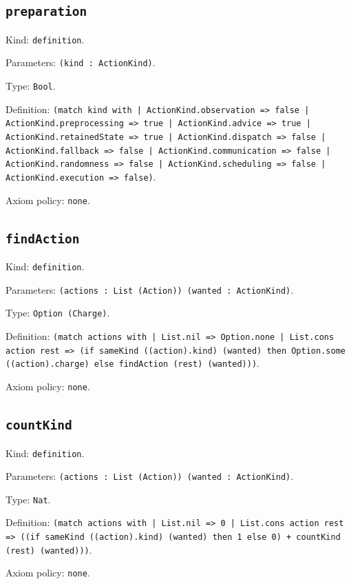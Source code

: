 \documentclass[11pt]{article}
\begin{document}
\subsection*{\texttt{preparation}}
\noindent Kind: \texttt{definition}.\par
\noindent Parameters: \texttt{(kind : ActionKind)}.\par
\noindent Type: \texttt{Bool}.\par
\noindent Definition: \texttt{(match kind with | ActionKind.observation => false | ActionKind.preprocessing => true | ActionKind.advice => true | ActionKind.retainedState => true | ActionKind.dispatch => false | ActionKind.fallback => false | ActionKind.communication => false | ActionKind.randomness => false | ActionKind.scheduling => false | ActionKind.execution => false)}.\par
\noindent Axiom policy: \texttt{none}.\par
\subsection*{\texttt{findAction}}
\noindent Kind: \texttt{definition}.\par
\noindent Parameters: \texttt{(actions : List (Action)) (wanted : ActionKind)}.\par
\noindent Type: \texttt{Option (Charge)}.\par
\noindent Definition: \texttt{(match actions with | List.nil => Option.none | List.cons action rest => (if sameKind ((action).kind) (wanted) then Option.some ((action).charge) else findAction (rest) (wanted)))}.\par
\noindent Axiom policy: \texttt{none}.\par
\subsection*{\texttt{countKind}}
\noindent Kind: \texttt{definition}.\par
\noindent Parameters: \texttt{(actions : List (Action)) (wanted : ActionKind)}.\par
\noindent Type: \texttt{Nat}.\par
\noindent Definition: \texttt{(match actions with | List.nil => 0 | List.cons action rest => ((if sameKind ((action).kind) (wanted) then 1 else 0) + countKind (rest) (wanted)))}.\par
\noindent Axiom policy: \texttt{none}.\par
\end{document}
